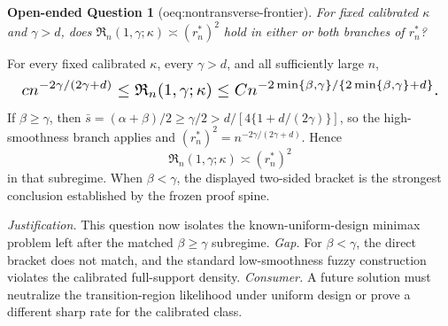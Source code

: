 \documentclass{article}
\newtheorem{openendedquestion}{Open-ended Question}
\begin{document}
\begin{openendedquestion}[oeq:nontransverse-frontier]\label{oeq:nontransverse-frontier}
For fixed calibrated \(\kappa\) and \(\gamma>d\), does \(\mathfrak R_n(1,\gamma;\kappa)\asymp(r_n^*)^2\) hold in either or both branches of \(r_n^*\)?
\end{openendedquestion}
For every fixed calibrated \(\kappa\), every \(\gamma>d\), and all sufficiently large \(n\),
\[
\makebox[\linewidth][c]{\resizebox{0.98\linewidth}{!}{\(\displaystyle c n^{-2\gamma/(2\gamma+d)}
\le \mathfrak R_n(1,\gamma;\kappa)
\le C n^{-2\min\{\beta,\gamma\}/\{2\min\{\beta,\gamma\}+d\}}.\)}}
\]
If \(\beta\ge\gamma\), then \(\bar s=(\alpha+\beta)/2\ge\gamma/2>d/[4\{1+d/(2\gamma)\}]\), so the high-smoothness branch applies and \((r_n^*)^2=n^{-2\gamma/(2\gamma+d)}\). Hence
\[
\mathfrak R_n(1,\gamma;\kappa)\asymp(r_n^*)^2
\]
in that subregime. When \(\beta<\gamma\), the displayed two-sided bracket is the strongest conclusion established by the frozen proof spine.
\par\smallskip\noindent \textit{Justification.} This question now isolates the known-uniform-design minimax problem left after the matched \(\beta\ge\gamma\) subregime. \textit{Gap.} For \(\beta<\gamma\), the direct bracket does not match, and the standard low-smoothness fuzzy construction violates the calibrated full-support density. \textit{Consumer.} A future solution must neutralize the transition-region likelihood under uniform design or prove a different sharp rate for the calibrated class.
\end{document}
